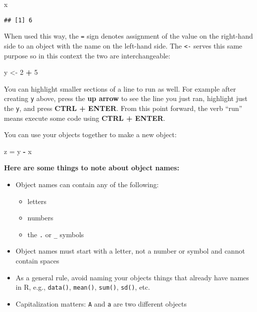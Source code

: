 \documentclass[]{book}
\newenvironment{Shaded}{\begin{snugshade}}{\end{snugshade}}
\newcommand{\DecValTok}[1]{\textcolor[rgb]{0.00,0.00,0.81}{#1}}
\newcommand{\StringTok}[1]{\textcolor[rgb]{0.31,0.60,0.02}{#1}}
\newcommand{\OperatorTok}[1]{\textcolor[rgb]{0.81,0.36,0.00}{\textbf{#1}}}
\newcommand{\NormalTok}[1]{#1}
\providecommand{\tightlist}{%
  \setlength{\itemsep}{0pt}\setlength{\parskip}{0pt}}
\theoremstyle{definition}
\theoremstyle{definition}
\theoremstyle{definition}
\theoremstyle{remark}
\begin{document}
\begin{Shaded}
\begin{Highlighting}[]
\NormalTok{x}
\end{Highlighting}
\end{Shaded}

\begin{verbatim}
## [1] 6
\end{verbatim}

When used this way, the \texttt{=} sign denotes assignment of the value
on the right-hand side to an object with the name on the left-hand side.
The \texttt{\textless{}-} serves this same purpose so in this context
the two are interchangeable:

\begin{Shaded}
\begin{Highlighting}[]
\NormalTok{y <-}\StringTok{ }\DecValTok{2} \OperatorTok{+}\StringTok{ }\DecValTok{5}
\end{Highlighting}
\end{Shaded}

You can highlight smaller sections of a line to run as well. For example
after creating \texttt{y} above, press the \textbf{up arrow} to see the
line you just ran, highlight just the \texttt{y}, and press \textbf{CTRL
+ ENTER}. From this point forward, the verb ``run'' means execute some
code using \textbf{CTRL + ENTER}.

You can use your objects together to make a new object:

\begin{Shaded}
\begin{Highlighting}[]
\NormalTok{z =}\StringTok{ }\NormalTok{y }\OperatorTok{-}\StringTok{ }\NormalTok{x}
\end{Highlighting}
\end{Shaded}

\textbf{Here are some things to note about object names:}

\begin{itemize}
\tightlist
\item
  Object names can contain any of the following:

  \begin{itemize}
  \tightlist
  \item
    letters
  \item
    numbers
  \item
    the \texttt{.} or \texttt{\_} symbols
  \end{itemize}
\item
  Object names must start with a letter, not a number or symbol and
  cannot contain spaces
\item
  As a general rule, avoid naming your objects things that already have
  names in R, e.g., \texttt{data()}, \texttt{mean()}, \texttt{sum()},
  \texttt{sd()}, etc.
\item
  Capitalization matters: \texttt{A} and \texttt{a} are two different
  objects
\end{itemize}
\end{document}
